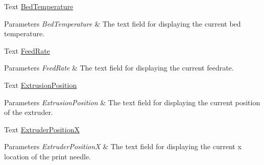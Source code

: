 \begin{DoxyCompactItemize}
\mbox{\label{class_u_i_controller_a680c68becba759ccd4b587406ab1c394}} 
Text \hyperlink{class_u_i_controller_a680c68becba759ccd4b587406ab1c394}{Bed\+Temperature}
\begin{DoxyCompactList}\small\item\em 
\begin{DoxyParams}{Parameters}
{\em Bed\+Temperature} & The text field for displaying the current bed temperature.\\
\hline
\end{DoxyParams}
\end{DoxyCompactList}\item 
\mbox{\label{class_u_i_controller_a994f6e8efe28969227da85c0d0be9707}} 
Text \hyperlink{class_u_i_controller_a994f6e8efe28969227da85c0d0be9707}{Feed\+Rate}
\begin{DoxyCompactList}\small\item\em 
\begin{DoxyParams}{Parameters}
{\em Feed\+Rate} & The text field for displaying the current feedrate.\\
\hline
\end{DoxyParams}
\end{DoxyCompactList}\item 
\mbox{\label{class_u_i_controller_a5575def461bc517ce48b0de312c4ebd7}} 
Text \hyperlink{class_u_i_controller_a5575def461bc517ce48b0de312c4ebd7}{Extrusion\+Position}
\begin{DoxyCompactList}\small\item\em 
\begin{DoxyParams}{Parameters}
{\em Extrusion\+Position} & The text field for displaying the current position of the extruder.\\
\hline
\end{DoxyParams}
\end{DoxyCompactList}\item 
\mbox{\label{class_u_i_controller_ac44230ef75e3b296750801393477de69}} 
Text \hyperlink{class_u_i_controller_ac44230ef75e3b296750801393477de69}{Extruder\+PositionX}
\begin{DoxyCompactList}\small\item\em 
\begin{DoxyParams}{Parameters}
{\em Extruder\+PositionX} & The text field for displaying the current x location of the print needle.\\

\end{DoxyParams}
\end{DoxyCompactList}
\end{DoxyCompactItemize}
